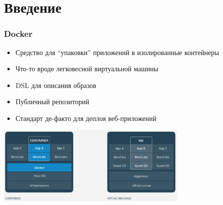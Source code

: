 \documentclass{../../slides-style}
\begin{document}
    \begin{frame}[plain]
        \titlepage
    \end{frame}

    \section{Введение}

    \begin{frame}
        \frametitle{Docker}
        \begin{itemize}
            \item Средство для ``упаковки'' приложений в изолированные контейнеры
            \item Что-то вроде легковесной виртуальной машины
            \item DSL для описания образов 
            \item Публичный репозиторий
            \item Стандарт де-факто для деплоя веб-приложений
        \end{itemize}
        \begin{center}
            \includegraphics[width=0.7\textwidth]{docker.png}
        \end{center}
    \end{frame}
\end{document}

